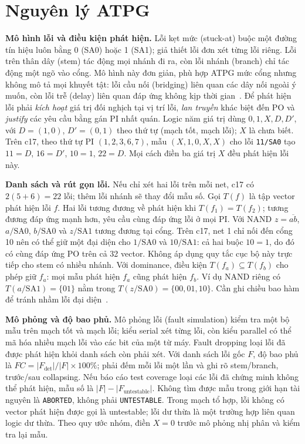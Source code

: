 \chapter{Nguyên lý ATPG}
\label{sec:p1-nguyen-ly-atpg}
\textbf{Mô hình lỗi và điều kiện phát hiện.}
Lỗi kẹt mức (stuck-at) buộc một đường tín hiệu luôn bằng 0 (SA0) hoặc 1
(SA1); giả thiết lỗi đơn xét từng lỗi riêng. Lỗi trên thân dây (stem) tác
động mọi nhánh đi ra, còn lỗi nhánh (branch) chỉ tác động một ngõ vào cổng.
Mô hình này đơn giản, phù hợp ATPG mức cổng nhưng không mô tả mọi khuyết tật:
lỗi cầu nối (bridging) liên quan các dây nối ngoài ý muốn, còn lỗi trễ
(delay) liên quan đáp ứng không kịp thời gian~\cite[Ch.~1]{p1_wang2006}.
Để phát hiện lỗi phải \emph{kích hoạt} giá trị đối nghịch tại vị trí lỗi,
\emph{lan truyền} khác biệt đến PO và \emph{justify} các yêu cầu bằng gán PI
nhất quán. Logic năm giá trị dùng $0,1,X,D,D'$, với
$D=(1,0)$, $D'=(0,1)$ theo thứ tự (mạch tốt, mạch lỗi); $X$ là chưa biết.
Trên c17, theo thứ tự PI $(1,2,3,6,7)$, mẫu $(X,1,0,X,X)$ cho lỗi
\texttt{11/SA0} tạo $11=D$, $16=D'$, $10=1$, $22=D$.
Mọi cách điền ba giá trị $X$ đều phát hiện lỗi này.

\textbf{Danh sách và rút gọn lỗi.}
Nếu chỉ xét hai lỗi trên mỗi net, c17 có $2(5+6)=22$ lỗi; thêm lỗi nhánh
sẽ thay đổi mẫu số. Gọi $T(f)$ là tập vector phát hiện lỗi $f$.
Hai lỗi tương đương về phát hiện khi $T(f_1)=T(f_2)$; tương đương đáp ứng
mạnh hơn, yêu cầu cùng đáp ứng lỗi ở mọi PI. Với NAND $z=\overline{ab}$,
$a/\mathrm{SA0}$, $b/\mathrm{SA0}$ và $z/\mathrm{SA1}$ tương đương tại cổng.
Trên c17, net 1 chỉ nối đến cổng 10 nên có thể giữ một đại diện cho
$1/\mathrm{SA0}$ và $10/\mathrm{SA1}$: cả hai buộc $10=1$, do đó có cùng
đáp ứng PO trên cả 32 vector. Không áp dụng quy tắc cục bộ này trực tiếp
cho stem có nhiều nhánh. Với dominance, điều kiện
$T(f_a)\subseteq T(f_b)$ cho phép giữ $f_a$: mọi mẫu phát hiện $f_a$ cũng
phát hiện $f_b$. Ví dụ NAND riêng có $T(a/\mathrm{SA1})=\{01\}$ nằm trong
$T(z/\mathrm{SA0})=\{00,01,10\}$. Cần ghi chiều bao hàm để tránh nhầm
lỗi đại diện~\cite[pp.~12--14]{p1_wang2006}.

\textbf{Mô phỏng và độ bao phủ.}
Mô phỏng lỗi (fault simulation) kiểm tra một bộ mẫu trên mạch tốt và mạch lỗi;
kiểu serial xét từng lỗi, còn kiểu parallel có thể mã hóa nhiều mạch lỗi vào
các bit của một từ máy. Fault dropping loại lỗi đã được phát hiện khỏi
danh sách còn phải xét. Với danh sách lỗi gốc $F$, độ bao phủ là
$FC=|F_{\mathrm{det}}|/|F|\times100\%$; phải đếm mỗi lỗi một lần và ghi rõ
stem/branch, trước/sau collapsing. Nếu báo cáo test coverage loại các lỗi
đã chứng minh không thể phát hiện, mẫu số là $|F|-|F_{\mathrm{untestable}}|$.
Không tìm được mẫu trong giới hạn tài nguyên là \texttt{ABORTED}, không phải
\texttt{UNTESTABLE}. Trong mạch tổ hợp, lỗi không có vector phát hiện được
gọi là untestable; lỗi dư thừa là một trường hợp liên quan logic dư thừa.
Theo quy ước nhóm, điền $X=0$ trước mô phỏng nhị phân và kiểm tra lại mẫu.

